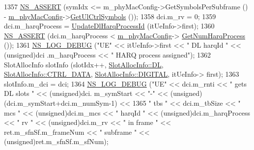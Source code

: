\begin{DoxyCode}
1357                         \hyperlink{assert_8h_a6dccdb0de9b252f60088ce281c49d052}{NS\_ASSERT} (symIdx <= m\_phyMacConfig->GetSymbolsPerSubframe () - 
      \hyperlink{classns3_1_1MmWaveMacScheduler_a24d7af4971d2e500fe543cefbafa2fd9}{m\_phyMacConfig}->\hyperlink{classns3_1_1MmWavePhyMacCommon_aa0bf8af14050bc5dc6513fbc86319a9b}{GetUlCtrlSymbols} ());
1358                         dci.m\_rv = 0;
1359                         dci.m\_harqProcess = \hyperlink{classns3_1_1MmWaveFlexTtiMacScheduler_ae6166d2b40f1dc7c8407c7d620a8ea02}{UpdateDlHarqProcessId} (itUeInfo->first);
1360                         \hyperlink{assert_8h_a6dccdb0de9b252f60088ce281c49d052}{NS\_ASSERT} (dci.m\_harqProcess < \hyperlink{classns3_1_1MmWaveMacScheduler_a24d7af4971d2e500fe543cefbafa2fd9}{m\_phyMacConfig}->
      \hyperlink{classns3_1_1MmWavePhyMacCommon_a40773d84172ebeb5aff125f56ebcc5ac}{GetNumHarqProcess} ());
1361                         \hyperlink{group__logging_ga413f1886406d49f59a6a0a89b77b4d0a}{NS\_LOG\_DEBUG} (\textcolor{stringliteral}{"UE"} << itUeInfo->first << \textcolor{stringliteral}{" DL harqId "} << (\textcolor{keywordtype}{unsigned})dci
      .m\_harqProcess << \textcolor{stringliteral}{" HARQ process assigned"});
1362                         SlotAllocInfo slotInfo (slotIdx++, \hyperlink{structns3_1_1SlotAllocInfo_a6cad60db1d39034f1851e2cea625fe5da9a365c9c56b7c32dcae38ee1a468ce6d}{SlotAllocInfo::DL}, 
      \hyperlink{structns3_1_1SlotAllocInfo_a3ea7cb503bfd0c9a4df55a71b81b9331a1ea636c3f068558fabacbc39934309b8}{SlotAllocInfo::CTRL\_DATA}, \hyperlink{structns3_1_1SlotAllocInfo_adcbd067d82be6260b3399167d8f0b4eca47a67c342db658a08ded9ce4b49417ea}{SlotAllocInfo::DIGITAL}, itUeInfo->
      first);
1363                         slotInfo.m\_dci = dci;
1364                         \hyperlink{group__logging_ga413f1886406d49f59a6a0a89b77b4d0a}{NS\_LOG\_DEBUG} (\textcolor{stringliteral}{"UE"} << dci.m\_rnti << \textcolor{stringliteral}{" gets DL slots "} << (\textcolor{keywordtype}{unsigned})dci.
      m\_symStart << \textcolor{stringliteral}{"-"} << (\textcolor{keywordtype}{unsigned})(dci.m\_symStart+dci.m\_numSym-1) <<
1365                                      \textcolor{stringliteral}{" tbs "} << dci.m\_tbSize << \textcolor{stringliteral}{" mcs "} << (\textcolor{keywordtype}{unsigned})dci.m\_mcs << \textcolor{stringliteral}{" harqId 
      "} << (\textcolor{keywordtype}{unsigned})dci.m\_harqProcess << \textcolor{stringliteral}{" rv "} << (\textcolor{keywordtype}{unsigned})dci.m\_rv << \textcolor{stringliteral}{" in frame "} << ret.m\_sfnSf.m\_frameNum 
      << \textcolor{stringliteral}{" subframe "} << (\textcolor{keywordtype}{unsigned})ret.m\_sfnSf.m\_sfNum);

\end{DoxyCode}
